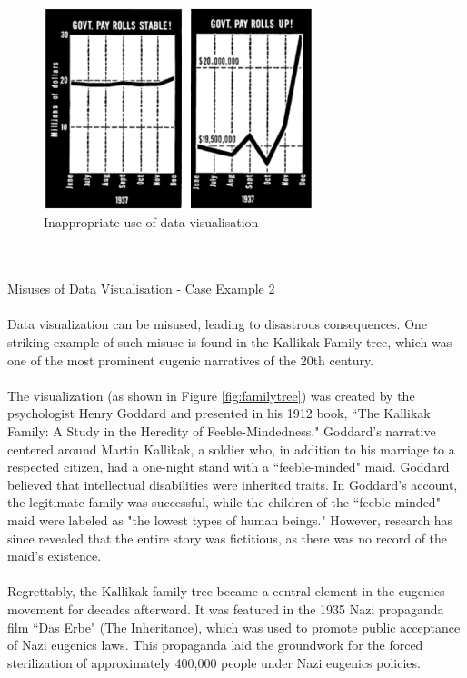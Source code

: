 \documentclass{article}\usepackage[]{graphicx}\usepackage[]{xcolor}
\begin{document}
\begin{figure}[H]
    \centering
    \includegraphics[width=0.7\textwidth]{misuse1.png}
    \caption{Inappropriate use of data visualisation}
    \label{fig:misuse1}
\end{figure}
\\  
\\Misuses of Data Visualisation - Case Example 2
\\  
\\Data visualization can be misused, leading to disastrous consequences. One striking example of such misuse is found in the Kallikak Family tree, which was one of the most prominent eugenic narratives of the 20th century.
\\  
\\The visualization (as shown in Figure \ref{fig:familytree}) was created by the psychologist Henry Goddard and presented in his 1912 book, ``The Kallikak Family: A Study in the Heredity of Feeble-Mindedness." Goddard's narrative centered around Martin Kallikak, a soldier who, in addition to his marriage to a respected citizen, had a one-night stand with a ``feeble-minded" maid. Goddard believed that intellectual disabilities were inherited traits. In Goddard's account, the legitimate family was successful, while the children of the ``feeble-minded" maid were labeled as "the lowest types of human beings." However, research has since revealed that the entire story was fictitious, as there was no record of the maid's existence.
\\  
\\Regrettably, the Kallikak family tree became a central element in the eugenics movement for decades afterward. It was featured in the 1935 Nazi propaganda film ``Das Erbe" (The Inheritance), which was used to promote public acceptance of Nazi eugenics laws. This propaganda laid the groundwork for the forced sterilization of approximately 400,000 people under Nazi eugenics policies.
\end{document}
